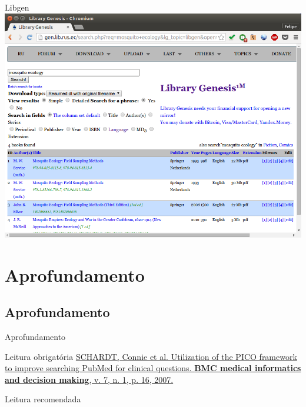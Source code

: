 \documentclass{beamer}
\begin{document}
\begin{frame}{Libgen}
  \centering
  \includegraphics[height=.85\textheight]{Busca/libgen-busca2}
\end{frame}

\section{Aprofundamento}

\subsection{Aprofundamento}

\begin{frame}{Aprofundamento}
  \begin{block}{Leitura obrigatória}
    \scriptsize
    \href{https://doi.org/10.1186/1472-6947-7-16}{SCHARDT, Connie et al. Utilization of the PICO framework to improve searching PubMed for clinical questions. {\bf BMC medical informatics and decision making}, v. 7, n. 1, p. 16, 2007.}
  \end{block}
  \begin{block}{Leitura recomendada}
  \end{block}
\end{frame}
\end{document}
